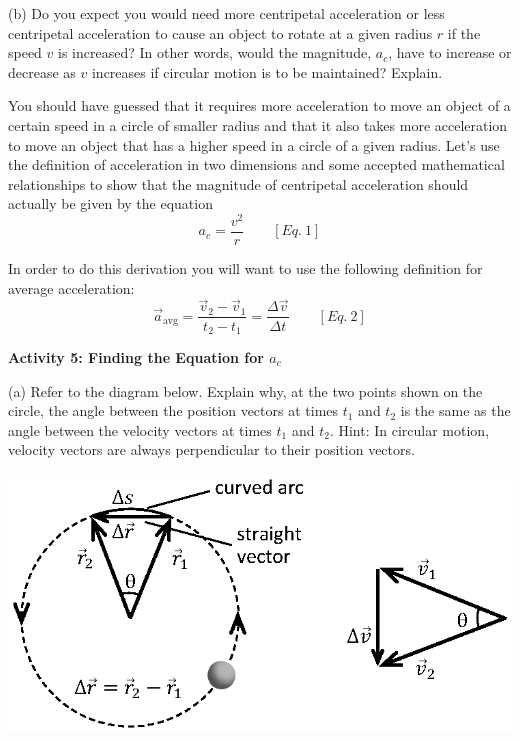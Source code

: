 (b) Do you expect you would need more centripetal acceleration or less centripetal
acceleration to cause an object to rotate at a given radius $r$ if the speed 
$v$
is increased? In other words, would the magnitude, \( a_{c} \), have to increase
or decrease as $v$ increases if circular motion is to be maintained? Explain.
\answerspace{20mm}

You should have guessed that it requires more acceleration to move an object
of a certain speed in a circle of smaller radius and that it also takes more
acceleration to move an object that has a higher speed in a circle of a given
radius. Let's use the definition of acceleration in two dimensions and some accepted
mathematical relationships to show that the magnitude of centripetal acceleration
should actually be given by the equation
\[
a_{c}=\frac{v^{2}}{r}\qquad [Eq.\: 1]\]


In order to do this derivation you will want to use the following definition
for average acceleration:
\[
 {\vec a}_{\mathrm{avg}} =\frac{{{\vec v}_{2}}-{{\vec v}_{1}}}
{t_{2}-t_{1}}=\frac{\Delta {\vec v}}{\Delta t}\qquad [Eq.\: 2]\]


\pagebreak[3]
\textbf{Activity 5: Finding the Equation for \(a _{c} \) }

(a) Refer to the diagram below. Explain why, at the two points shown on the
circle, the angle between the position vectors at times \( t_{1} \) and \( t_{2} \)
is the same as the angle between the velocity vectors at times \( t_{1} \)
and \( t_{2} \). Hint: In circular motion, velocity vectors are always perpendicular
to their position vectors.

\vspace{0.3cm}
{\par\raggedright \includegraphics{circ_motion/circ_motion_fig3_new.eps} \par}
\vspace{0.3cm}

